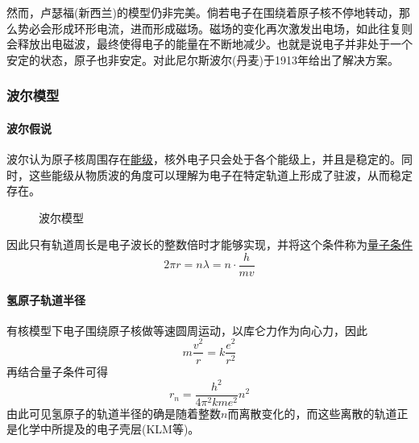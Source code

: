 然而，卢瑟福(新西兰)的模型仍非完美。倘若电子在围绕着原子核不停地转动，那么势必会形成环形电流，进而形成磁场。磁场的变化再次激发出电场，如此往复则会释放出电磁波，最终使得电子的能量在不断地减少。也就是说电子并非处于一个安定的状态，原子也非安定。对此尼尔斯波尔(丹麦)于1913年给出了解决方案。

\subsubsection{波尔模型}

\paragraph{波尔假说} 波尔认为原子核周围存在\underline{能级}，核外电子只会处于各个能级上，并且是稳定的。同时，这些能级从物质波的角度可以理解为电子在特定轨道上形成了驻波，从而稳定存在。
\begin{figure}[ht!]
    \centering
    \caption{波尔模型}
\end{figure}
因此只有轨道周长是电子波长的整数倍时才能够实现，并将这个条件称为\underline{量子条件}
\begin{equation*}
    2\pi r=n\lambda=n\cdot\frac{h}{mv}
\end{equation*}

\paragraph{氢原子轨道半径} 有核模型下电子围绕原子核做等速圆周运动，以库仑力作为向心力，因此
\begin{equation*}
    m\frac{v^2}{r}=k\frac{e^2}{r^2}
\end{equation*}
再结合量子条件可得
\begin{equation*}
    r_n=\frac{h^2}{4\pi^2kme^2}n^2
\end{equation*}
由此可见氢原子的轨道半径的确是随着整数$n$而离散变化的，而这些离散的轨道正是化学中所提及的电子壳层(KLM等)。

